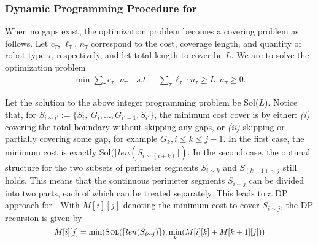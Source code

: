 \subsubsection{Dynamic Programming Procedure for \opgmc}
\def\sol{{\sc Sol}}
\def\presol{{\sc PreSolve}}
When no gaps exist, the optimization problem becomes a covering 
problem as follows. Let $c_{\tau}$, $\ell_{\tau}$, $n_{\tau}$ correspond to the cost, 
coverage length, and quantity of robot type ${\tau}$, respectively, and let total 
length to cover be $L$. We are to solve the optimization problem
\begin{align}\label{eq:ip}
    \min \sum_{\tau} c_{\tau} \cdot n_{\tau} \quad s.t.\, \quad
    \sum_{\tau} \ell_{\tau} \cdot n_{\tau} \geq L, n_{\tau}\geq 0.
\end{align}

Let the solution to the above integer programming problem be \sol($L$).
Notice that, for $S_{i\sim i'}:=\{S_i,\ G_i, \dots, 
G_{i'-1}, S_{i'}\}$, the minimum cost cover is by either: {\em (i)} 
covering the total boundary without skipping any gaps, 
%
or {\em (ii)} skipping or partially covering some gap, for example $G_k, 
i \le k \le j-1$.
%
In the first case, the minimum cost is exactly \sol$(\lceil len(S_{i\sim(i+k)}\rceil)$.
%
In the second case, the optimal structure for the two subsets of perimeter 
segments $S_{i\sim k}$ and $S_{(k+1)\sim j}$ still holds. This means that the 
continuous perimeter segments $S_{i\sim j}$ can be divided into two parts, 
each of which can be treated separately. This leads to a DP approach for \opgmc.
With $M[i][j]$ denoting the minimum cost to cover $S_{i\sim j}$, the DP recursion 
is given by
\[
	\scalebox{0.93}{$M[i][j] = \min(\textit{\sol}(\lceil len(S_{i\sim j})\rceil), \displaystyle\min_k(M[i][k]+M[k+1][j]))$}
\]


